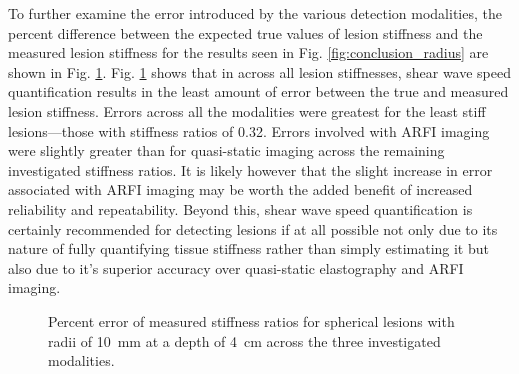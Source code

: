 			To further examine the error introduced by the various detection modalities, the percent difference between the expected true values of lesion stiffness and the measured lesion stiffness for the results seen in Fig. \ref{fig:conclusion_radius} are shown in Fig. \ref{fig:conclusions_radius_pd}. Fig. \ref{fig:conclusions_radius_pd} shows that in across all lesion stiffnesses, shear wave speed quantification results in the least amount of error between the true and measured lesion stiffness. Errors across all the modalities were greatest for the least stiff lesions---those with stiffness ratios of 0.32. Errors involved with ARFI imaging were slightly greater than for quasi-static imaging across the remaining investigated stiffness ratios. It is likely however that the slight increase in error associated with ARFI imaging may be worth the added benefit of increased reliability and repeatability. Beyond this, shear wave speed quantification is certainly recommended for detecting lesions if at all possible not only due to its nature of fully quantifying tissue stiffness rather than simply estimating it but also due to it's superior accuracy over quasi-static elastography and ARFI imaging.

			\begin{figure}[!htb]
				\centering
				\caption[Percent error of measured stiffness ratios for spherical lesions across the three investigated modalities]{Percent error of measured stiffness ratios for spherical lesions with radii of \SI{10}{\mm} at a depth of \SI{4}{\cm} across the three investigated modalities.}
				\label{fig:conclusions_radius_pd}
			\end{figure}

